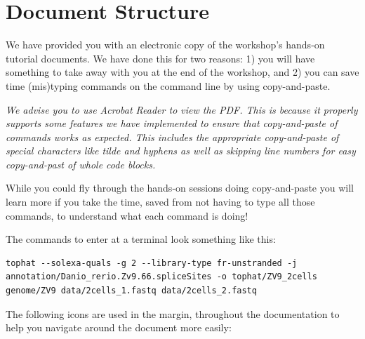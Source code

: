 %
%
\newpage


\section{Document Structure}
We have provided you with an electronic copy of the workshop's hands-on tutorial documents.
We have done this for two reasons: 1) you will have something to take away with you at the 
end of the workshop, and 2) you can save time (mis)typing commands on the command line by using
copy-and-paste.

\emph{We advise you to use Acrobat Reader to view the PDF. This is because it
properly supports some features we have implemented to ensure that
copy-and-paste of commands works as expected. This includes the appropriate
copy-and-paste of special characters like tilde and hyphens as well as skipping
line numbers for easy copy-and-past of whole code blocks.}

\begin{warning}
While you could fly through the hands-on sessions doing
copy-and-paste you will learn more if you take the time, saved from not having to type all those
commands, to understand what each command is doing!
\end{warning}

The commands to enter at a terminal look something like this:
\begin{lstlisting}
tophat --solexa-quals -g 2 --library-type fr-unstranded -j annotation/Danio_rerio.Zv9.66.spliceSites -o tophat/ZV9_2cells genome/ZV9 data/2cells_1.fastq data/2cells_2.fastq
\end{lstlisting}  

The following icons are used in the margin, throughout the documentation to help
you navigate around the document more easily:

